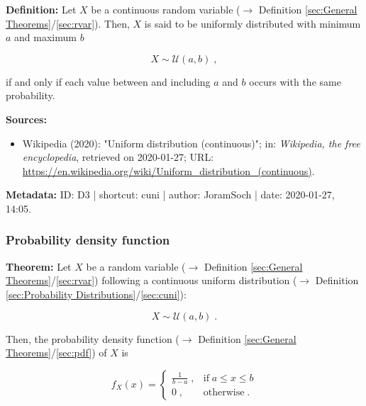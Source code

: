 \documentclass[a4paper,12pt,twoside]{book}
\begin{document}
\textbf{Definition:} Let $X$ be a continuous random variable ($\rightarrow$ Definition \ref{sec:General Theorems}/\ref{sec:rvar}). Then, $X$ is said to be uniformly distributed with minimum $a$ and maximum $b$

\begin{equation} \label{eq:cuni-cuni}
X \sim \mathcal{U}(a, b) \; ,
\end{equation}

if and only if each value between and including $a$ and $b$ occurs with the same probability.


\vspace{1em}
\textbf{Sources:}
\begin{itemize}
\item Wikipedia (2020): "Uniform distribution (continuous)"; in: \textit{Wikipedia, the free encyclopedia}, retrieved on 2020-01-27; URL: \url{https://en.wikipedia.org/wiki/Uniform_distribution_(continuous)}.
\end{itemize}


\vspace{1em}
\textbf{Metadata:} ID: D3 | shortcut: cuni | author: JoramSoch | date: 2020-01-27, 14:05.
\vspace{1em}



\subsubsection[\textbf{Probability density function}]{Probability density function} \label{sec:cuni-pdf}
\setcounter{equation}{0}

\textbf{Theorem:} Let $X$ be a random variable ($\rightarrow$ Definition \ref{sec:General Theorems}/\ref{sec:rvar}) following a continuous uniform distribution ($\rightarrow$ Definition \ref{sec:Probability Distributions}/\ref{sec:cuni}):

\begin{equation} \label{eq:cuni-pdf-cuni}
X \sim \mathcal{U}(a, b) \; .
\end{equation}

Then, the probability density function ($\rightarrow$ Definition \ref{sec:General Theorems}/\ref{sec:pdf}) of $X$ is

\begin{equation} \label{eq:cuni-pdf-cuni-pdf}
f_X(x) = \left\{
\begin{array}{rl}
\frac{1}{b-a} \; , & \text{if} \; a \leq x \leq b \\
0 \; , & \text{otherwise} \; .
\end{array}
\right.
\end{equation}
\end{document}
